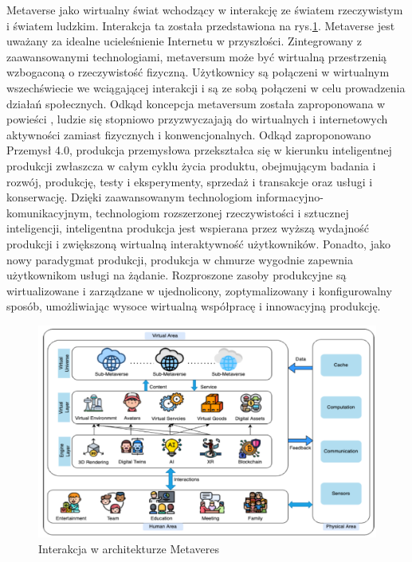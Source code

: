 Metaverse jako wirtualny świat  wchodzący w interakcję ze światem rzeczywistym i światem ludzkim. Interakcja ta została przedstawiona na rys.\ref{abstractMetaverseArchitectureHumanVirtualPhisical}. Metaverse jest uważany za idealne ucieleśnienie Internetu w przyszłości. Zintegrowany z zaawansowanymi technologiami, metaversum może być wirtualną przestrzenią wzbogaconą o rzeczywistość fizyczną. Użytkownicy są połączeni w wirtualnym wszechświecie we wciągającej interakcji i są ze sobą połączeni w celu prowadzenia działań społecznych. Odkąd koncepcja metaversum została zaproponowana w powieści , ludzie się stopniowo przyzwyczajają do wirtualnych i internetowych aktywności zamiast fizycznych i konwencjonalnych. Odkąd zaproponowano Przemysł 4.0, produkcja przemysłowa przekształca się w kierunku inteligentnej produkcji zwłaszcza w całym cyklu życia produktu, obejmującym badania i rozwój, produkcję, testy i eksperymenty, sprzedaż i transakcje oraz usługi i konserwację. Dzięki zaawansowanym technologiom informacyjno-komunikacyjnym, technologiom rozszerzonej rzeczywistości i sztucznej inteligencji, inteligentna produkcja jest wspierana przez wyższą wydajność produkcji i zwiększoną wirtualną interaktywność użytkowników. Ponadto, jako nowy paradygmat produkcji, produkcja w chmurze wygodnie zapewnia użytkownikom usługi na żądanie. Rozproszone zasoby produkcyjne są wirtualizowane i zarządzane w ujednolicony, zoptymalizowany i konfigurowalny sposób, umożliwiając wysoce wirtualną współpracę i innowacyjną produkcję\cite{industrialMetaverseForSmartManufacturing}. 

\begin{figure}[htbp!]
    \centering
    \includegraphics[width=\textwidth]{images/metaverse/metaverseAbstractArchitecture.png}
    \caption{Interakcja w architekturze Metaveres\cite{aSurveyofMobileEdgeComputingForMetaverse}}
    \label{abstractMetaverseArchitectureHumanVirtualPhisical}
\end{figure}

